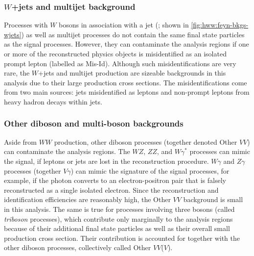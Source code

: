 \subsubsection{$W$+jets and multijet background}
Processes with $W$ bosons in association with a jet (\Wjets; shown in \cref{fig:hww:feyn-bkgs-wjets}) as well as multijet processes do not contain the same final state particles as the signal processes. However, they can contaminate the analysis regions if one or more of the reconstructed physics objects is misidentified as an isolated prompt lepton (labelled as Mis-Id). 
Although such misidentifications are very rare, the $W$+jets and multijet production are sizeable backgrounds in this analysis due to their large production cross sections.
The misidentifications come from two main sources: jets misidentified as leptons and non-prompt leptons from heavy hadron decays within jets. 

\subsubsection{Other diboson and multi-boson backgrounds}
Aside from $WW$ production, other diboson processes (together denoted Other $VV$) can contaminate the analysis regions. 
The $WZ$, $ZZ$, and $W\gamma^*$ processes can mimic the signal, if leptons or jets are lost in the reconstruction procedure. 
$W\gamma$ and $Z\gamma$ processes (together $V\gamma$) can mimic the signature of the signal processes, for example, if the photon converts to an electron-positron pair that is falsely reconstructed as a single isolated electron. 
Since the reconstruction and identification efficiencies are reasonably high, the Other $VV$ background is small in this analysis.
The same is true for processes involving three bosons (called \emph{triboson} processes), which contribute only marginally to the analysis regions because of their additional final state particles as well as their overall small production cross section. Their contribution is accounted for together with the other diboson processes, collectively called Other $VV$($V$). 

